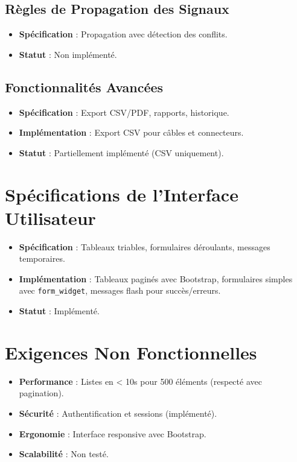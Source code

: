 \documentclass[a4paper,12pt]{article}
\begin{document}
\subsection{Règles de Propagation des Signaux}
\begin{itemize}
    \item \textbf{Spécification} : Propagation avec détection des conflits.
    \item \textbf{Statut} : Non implémenté.
\end{itemize}

\subsection{Fonctionnalités Avancées}
\begin{itemize}
    \item \textbf{Spécification} : Export CSV/PDF, rapports, historique.
    \item \textbf{Implémentation} : Export CSV pour câbles et connecteurs.
    \item \textbf{Statut} : Partiellement implémenté (CSV uniquement).
\end{itemize}

\section{Spécifications de l’Interface Utilisateur}
\begin{itemize}
    \item \textbf{Spécification} : Tableaux triables, formulaires déroulants, messages temporaires.
    \item \textbf{Implémentation} : Tableaux paginés avec Bootstrap, formulaires simples avec \texttt{form\_widget}, messages flash pour succès/erreurs.
    \item \textbf{Statut} : Implémenté.
\end{itemize}

\section{Exigences Non Fonctionnelles}
\begin{itemize}
    \item \textbf{Performance} : Listes en < 10s pour 500 éléments (respecté avec pagination).
    \item \textbf{Sécurité} : Authentification et sessions (implémenté).
    \item \textbf{Ergonomie} : Interface responsive avec Bootstrap.
    \item \textbf{Scalabilité} : Non testé.
\end{itemize}
\end{document}
